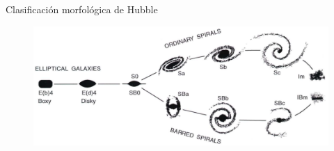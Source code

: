 \documentclass[xcolor=dvipsnames,4pt]{beamer}
\newenvironment{changemargin}[2]{%
  \begin{list}{}{%
    \setlength{\topsep}{0pt}%
    \setlength{\leftmargin}{#1}%
    \setlength{\rightmargin}{#2}%
    \setlength{\listparindent}{\parindent}%
    \setlength{\itemindent}{\parindent}%
    \setlength{\parsep}{\parskip}%
  }%
\item[]}{\end{list}}
\begin{document}
\begin{frame}{Clasificación morfológica de Hubble}
\begin{changemargin}{-1cm}{-1cm}
\begin{figure}
\centering
\includegraphics[scale=0.8]{img/hubble_diap.png}
\end{figure}
\end{changemargin}
\end{frame}
\end{document}
